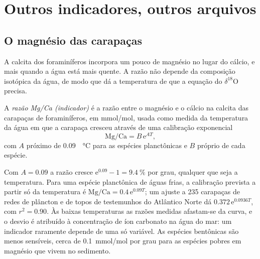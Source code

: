 \section{Outros indicadores, outros arquivos}\label{sec:b2:climate-proxies:others}

\subsection*{O magnésio das carapaças}

A calcita dos foraminíferos incorpora um pouco de magnésio no lugar do cálcio, e mais quando
a água está mais quente. A razão não depende da composição isotópica da água, de modo que
dá a temperatura de que a equação do $\delta^{18}$O precisa.

\begin{definition}\label{def:b2:climate-proxies:mgca}
A \emph{razão Mg/Ca (indicador)} é a razão entre o magnésio e o cálcio
na calcita das carapaças de foraminíferos, em \unit{mmol/mol}, usada como medida da temperatura da
água em que a carapaça cresceu através de uma calibração exponencial
\[
  \text{Mg/Ca} = B\,\mathrm{e}^{A T},
\]
com $A$ próximo de \qty{0.09}{\per\celsius} para as espécies planctônicas e $B$ próprio de cada espécie.
\end{definition}

Com $A = 0.09$ a razão cresce $\mathrm{e}^{0.09} - 1 = \qty{9.4}{\percent}$ por grau,
qualquer que seja a temperatura. Para uma espécie planctônica de águas frias, a calibração prevista a partir
só da temperatura é $\text{Mg/Ca} = 0.4\,\mathrm{e}^{0.09T}$; um ajuste a 235 carapaças de redes de
plâncton e de topos de testemunhos do Atlântico Norte dá $0.372\,\mathrm{e}^{0.0936T}$, com $r^2 = 0.90$.
Às baixas temperaturas as razões medidas afastam-se da curva, e o desvio é atribuído à
concentração de íon carbonato na água do mar: um indicador raramente depende de uma só variável.
As espécies bentônicas são menos sensíveis, cerca de \qty{0.1}{mmol/mol} por grau para as espécies
pobres em magnésio que vivem no sedimento.

